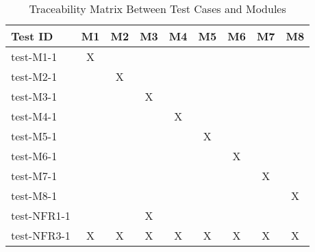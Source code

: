 \documentclass[12pt, titlepage]{article}
\begin{document}
\begin{table}[h!]\label{Table:Unit}
  \centering
  \begin{tabular}{|l|c|c|c|c|c|c|c|c|}
  \hline
  \textbf{Test ID} & \textbf{M1} & \textbf{M2} & \textbf{M3} & \textbf{M4} & \textbf{M5} & \textbf{M6} & \textbf{M7} & \textbf{M8} \\
  \hline
  test-M1-1 & X &   &   &   &   &   &   &   \\
  test-M2-1 &   & X &   &   &   &   &   &   \\
  test-M3-1 &   &   & X &   &   &   &   &   \\
  test-M4-1 &   &   &   & X &   &   &   &   \\
  test-M5-1 &   &   &   &   & X &   &   &   \\
  test-M6-1 &   &   &   &   &   & X &   &   \\
  test-M7-1 &   &   &   &   &   &  &  X &   \\
  test-M8-1 &   &   &   &   &   &   &   & X \\
  \hline
  test-NFR1-1 &   &   & X &   &   &   &   &   \\
  test-NFR3-1 & X & X & X & X & X & X & X & X \\
  \hline
  \end{tabular}
  \caption{Traceability Matrix Between Test Cases and Modules}
  \end{table}
				



\end{document}
